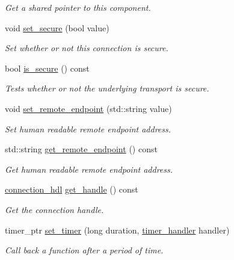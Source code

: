 \begin{DoxyCompactItemize}
\begin{DoxyCompactList}\small\item\em Get a shared pointer to this component. \end{DoxyCompactList}\item 
void \hyperlink{classwebsocketpp_1_1transport_1_1stub_1_1connection_afc1b6434bfe02d2efcda9e2887af83c4}{set\+\_\+secure} (bool value)
\begin{DoxyCompactList}\small\item\em Set whether or not this connection is secure. \end{DoxyCompactList}\item 
bool \hyperlink{classwebsocketpp_1_1transport_1_1stub_1_1connection_ab3cc0e613fc79838003c681d55ffa746}{is\+\_\+secure} () const
\begin{DoxyCompactList}\small\item\em Tests whether or not the underlying transport is secure. \end{DoxyCompactList}\item 
void \hyperlink{classwebsocketpp_1_1transport_1_1stub_1_1connection_a33b09a9683c924a15bb536613c4685c9}{set\+\_\+remote\+\_\+endpoint} (std\+::string value)
\begin{DoxyCompactList}\small\item\em Set human readable remote endpoint address. \end{DoxyCompactList}\item 
std\+::string \hyperlink{classwebsocketpp_1_1transport_1_1stub_1_1connection_a7e7692636f506e0b504b4839bfc71c6c}{get\+\_\+remote\+\_\+endpoint} () const
\begin{DoxyCompactList}\small\item\em Get human readable remote endpoint address. \end{DoxyCompactList}\item 
\hyperlink{namespacewebsocketpp_a6b3d26a10ee7229b84b776786332631d}{connection\+\_\+hdl} \hyperlink{classwebsocketpp_1_1transport_1_1stub_1_1connection_a7e21eb9d7ca9354603c9068b31d43a94}{get\+\_\+handle} () const
\begin{DoxyCompactList}\small\item\em Get the connection handle. \end{DoxyCompactList}\item 
timer\+\_\+ptr \hyperlink{classwebsocketpp_1_1transport_1_1stub_1_1connection_a0566c24deef4c7e5bff957510c366b26}{set\+\_\+timer} (long duration, \hyperlink{namespacewebsocketpp_1_1transport_a946cc56ff41139f3002149c15fd87bc9}{timer\+\_\+handler} handler)
\begin{DoxyCompactList}\small\item\em Call back a function after a period of time. \end{DoxyCompactList}\end{DoxyCompactItemize}
